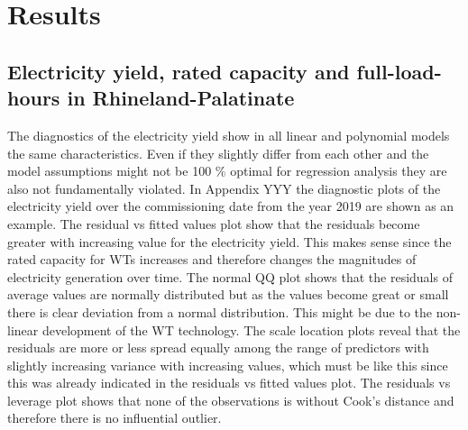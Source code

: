 \documentclass[a4paper,11pt]{article}
\begin{document}
\hypertarget{results}{%
\section{Results}\label{results}}

\hypertarget{electricity-yield-rated-capacity-and-full-load-hours-in-rhineland-palatinate}{%
\subsection{Electricity yield, rated capacity and full-load-hours in Rhineland-Palatinate}\label{electricity-yield-rated-capacity-and-full-load-hours-in-rhineland-palatinate}}

The diagnostics of the electricity yield show in all linear and polynomial models the same characteristics. Even if they slightly differ from each other and the model assumptions might not be 100 \% optimal for regression analysis they are also not fundamentally violated. In Appendix YYY the diagnostic plots of the electricity yield over the commissioning date from the year 2019 are shown as an example. The residual vs fitted values plot show that the residuals become greater with increasing value for the electricity yield. This makes sense since the rated capacity for WTs increases and therefore changes the magnitudes of electricity generation over time. The normal QQ plot shows that the residuals of average values are normally distributed but as the values become great or small there is clear deviation from a normal distribution. This might be due to the non-linear development of the WT technology. The scale location plots reveal that the residuals are more or less spread equally among the range of predictors with slightly increasing variance with increasing values, which must be like this since this was already indicated in the residuals vs fitted values plot. The residuals vs leverage plot shows that none of the observations is without Cook's distance and therefore there is no influential outlier.
\end{document}
